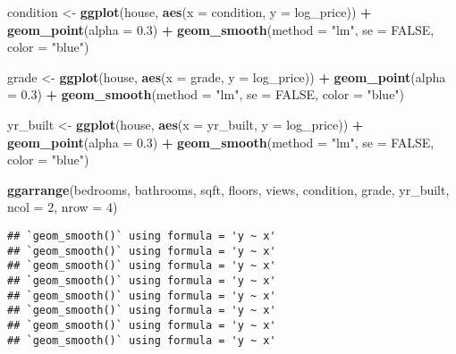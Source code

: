 \documentclass[
]{article}
\newenvironment{Shaded}{\begin{snugshade}}{\end{snugshade}}
\newcommand{\AttributeTok}[1]{\textcolor[rgb]{0.13,0.29,0.53}{#1}}
\newcommand{\ConstantTok}[1]{\textcolor[rgb]{0.56,0.35,0.01}{#1}}
\newcommand{\DecValTok}[1]{\textcolor[rgb]{0.00,0.00,0.81}{#1}}
\newcommand{\FloatTok}[1]{\textcolor[rgb]{0.00,0.00,0.81}{#1}}
\newcommand{\FunctionTok}[1]{\textcolor[rgb]{0.13,0.29,0.53}{\textbf{#1}}}
\newcommand{\NormalTok}[1]{#1}
\newcommand{\OtherTok}[1]{\textcolor[rgb]{0.56,0.35,0.01}{#1}}
\newcommand{\SpecialCharTok}[1]{\textcolor[rgb]{0.81,0.36,0.00}{\textbf{#1}}}
\newcommand{\StringTok}[1]{\textcolor[rgb]{0.31,0.60,0.02}{#1}}
\begin{document}
\begin{Shaded}
\begin{Highlighting}[]
\NormalTok{condition }\OtherTok{\textless{}{-}} \FunctionTok{ggplot}\NormalTok{(house, }\FunctionTok{aes}\NormalTok{(}\AttributeTok{x =}\NormalTok{ condition, }\AttributeTok{y =}\NormalTok{ log\_price)) }\SpecialCharTok{+}
  \FunctionTok{geom\_point}\NormalTok{(}\AttributeTok{alpha =} \FloatTok{0.3}\NormalTok{) }\SpecialCharTok{+}
  \FunctionTok{geom\_smooth}\NormalTok{(}\AttributeTok{method =} \StringTok{"lm"}\NormalTok{, }\AttributeTok{se =} \ConstantTok{FALSE}\NormalTok{, }\AttributeTok{color =} \StringTok{"blue"}\NormalTok{)}

\NormalTok{grade }\OtherTok{\textless{}{-}} \FunctionTok{ggplot}\NormalTok{(house, }\FunctionTok{aes}\NormalTok{(}\AttributeTok{x =}\NormalTok{ grade, }\AttributeTok{y =}\NormalTok{ log\_price)) }\SpecialCharTok{+}
  \FunctionTok{geom\_point}\NormalTok{(}\AttributeTok{alpha =} \FloatTok{0.3}\NormalTok{) }\SpecialCharTok{+}
  \FunctionTok{geom\_smooth}\NormalTok{(}\AttributeTok{method =} \StringTok{"lm"}\NormalTok{, }\AttributeTok{se =} \ConstantTok{FALSE}\NormalTok{, }\AttributeTok{color =} \StringTok{"blue"}\NormalTok{)}

\NormalTok{yr\_built }\OtherTok{\textless{}{-}} \FunctionTok{ggplot}\NormalTok{(house, }\FunctionTok{aes}\NormalTok{(}\AttributeTok{x =}\NormalTok{ yr\_built, }\AttributeTok{y =}\NormalTok{ log\_price)) }\SpecialCharTok{+}
  \FunctionTok{geom\_point}\NormalTok{(}\AttributeTok{alpha =} \FloatTok{0.3}\NormalTok{) }\SpecialCharTok{+}
  \FunctionTok{geom\_smooth}\NormalTok{(}\AttributeTok{method =} \StringTok{"lm"}\NormalTok{, }\AttributeTok{se =} \ConstantTok{FALSE}\NormalTok{, }\AttributeTok{color =} \StringTok{"blue"}\NormalTok{)}
\end{Highlighting}
\end{Shaded}

\begin{Shaded}
\begin{Highlighting}[]
\FunctionTok{ggarrange}\NormalTok{(bedrooms, bathrooms, sqft, floors, views, condition, grade, yr\_built,}
  \AttributeTok{ncol =} \DecValTok{2}\NormalTok{, }\AttributeTok{nrow =} \DecValTok{4}\NormalTok{)}
\end{Highlighting}
\end{Shaded}

\begin{verbatim}
## `geom_smooth()` using formula = 'y ~ x'
## `geom_smooth()` using formula = 'y ~ x'
## `geom_smooth()` using formula = 'y ~ x'
## `geom_smooth()` using formula = 'y ~ x'
## `geom_smooth()` using formula = 'y ~ x'
## `geom_smooth()` using formula = 'y ~ x'
## `geom_smooth()` using formula = 'y ~ x'
## `geom_smooth()` using formula = 'y ~ x'
\end{verbatim}
\end{document}
